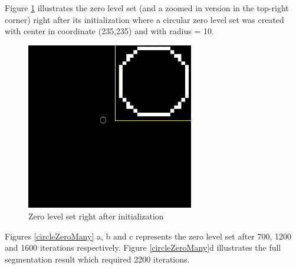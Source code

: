 Figure \ref{circleZero0} illustrates the zero level set (and a zoomed in version in the top-right corner) right after its initialization where a circular zero level set was created with center in coordinate (235,235) and with radius = 10. 
\begin{figure}[h!]
\centering
\includegraphics[width=0.65\textwidth]{results/circleZero0}
\caption{Zero level set right after initialization}
\label{circleZero0}
\end{figure} 

Figures \ref{circleZeroMany} a, b and c represents the zero level set after 700, 1200 and 1600 iterations respectively. Figure \ref{circleZeroMany}d illustrates the full segmentation result which required 2200 iterations.

